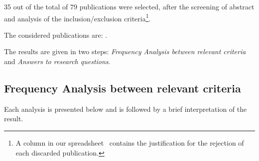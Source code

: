 \documentclass[a4paper]{IEEEtran}
\begin{document}
35 out of the total of 79 publications were selected, after the screening of abstract and analysis of the inclusion/exclusion criteria\footnote{A column in our spreadsheet~\cite{systematicMappingSpreadsheet} contains the justification for the rejection of each discarded publication.}.

The considered publications are: \cite{6665220} \cite{6253526}  \cite{6461875} \cite{6597164} \cite{6616442} \cite{Xiong:2012:DMR:2213598.2213614} \cite{Alomari:2014:CFD:2684200.2684324} \cite{6632740} \cite{6253597} \cite{cloudhosteddatabases} \cite{6655733} \cite{192837618237651293} \cite{6616442} \cite{designinganddevelopment} \cite{5959767} \cite{Petcu20131417} \cite{Giannikis:2013:WOU:2463676.2463678} \cite{1236781237} \cite{6280329} \cite{6681233} \cite{Xiong:2011:APA:2038916.2038931} \cite{7037676} \cite{7017947} \cite{Qiao:2013:BFE:2463676.2465298} \cite{5742778} \cite{Montes20132026} \cite{Elmore:2013:CTB:2463676.2465308} \cite{12789361729836} \cite{6842585} \cite{Shue:2014:ARV:2592798.2592823} \cite{Schram:2012:MND:2384716.2384773} \cite{buazuartransition} \cite{gomez2014building} \cite{6546068} \cite{6846456}.


The results are given in two steps: \textit{Frequency Analysis between relevant criteria} and \textit{Answers to research questions}. 

\subsection{Frequency Analysis between relevant criteria}
\label{frequencyAnalysis}

Each analysis is presented below and is followed by a brief interpretation of the result. 
\end{document}
